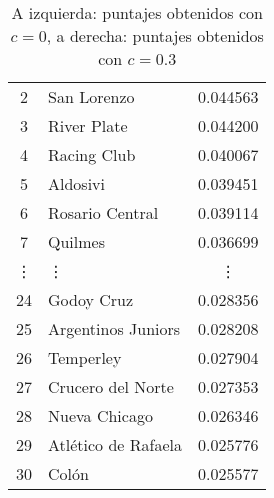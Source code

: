 \begin{table}[H]
\begin{center}
\begin{tabular}{| c | l | c |}
            2 & San Lorenzo & 0.044563 \\
            3 & River Plate & 0.044200 \\
            4 & Racing Club & 0.040067 \\
            5 & Aldosivi & 0.039451 \\
            6 & Rosario Central & 0.039114 \\
            7 & Quilmes & 0.036699 \\
            \vdots & \quad\vdots & \vdots \\
            24 & Godoy Cruz & 0.028356 \\
            25 & Argentinos Juniors & 0.028208 \\
            26 & Temperley & 0.027904 \\
            27 & Crucero del Norte & 0.027353 \\
            28 & Nueva Chicago & 0.026346 \\
            29 & Atlético de Rafaela & 0.025776 \\
            30 & Colón & 0.025577 \\
            \hline
        \end{tabular}
        \captionsetup{justification=centering}
        \caption{A izquierda: puntajes obtenidos con $c=0$, a derecha: puntajes obtenidos con $c=0.3$}
        \label{exp_resultados_variar_c_1}
    \end{center}
\end{table}

